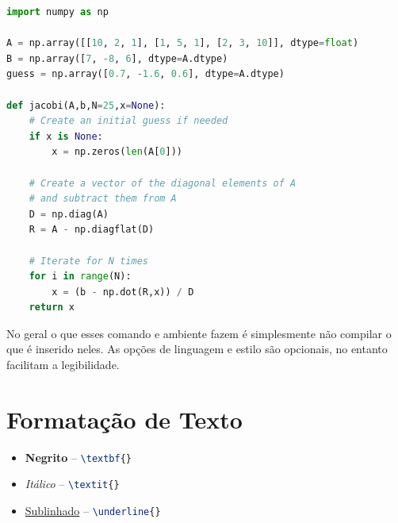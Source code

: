 \begin{lstlisting}[language=Python, style=Code]
import numpy as np

A = np.array([[10, 2, 1], [1, 5, 1], [2, 3, 10]], dtype=float)
B = np.array([7, -8, 6], dtype=A.dtype)
guess = np.array([0.7, -1.6, 0.6], dtype=A.dtype)

def jacobi(A,b,N=25,x=None):
    # Create an initial guess if needed                                                                                                                                                            
    if x is None:
        x = np.zeros(len(A[0]))

    # Create a vector of the diagonal elements of A                                                                                                                                                
    # and subtract them from A                                                                                                                                                                     
    D = np.diag(A)
    R = A - np.diagflat(D)

    # Iterate for N times                                                                                                                                                                          
    for i in range(N):
        x = (b - np.dot(R,x)) / D
    return x
\end{lstlisting}

    No geral o que esses comando e ambiente fazem é simplesmente não compilar o que é inserido neles.
    As opções de linguagem e estilo são opcionais, no entanto facilitam a legibilidade.


\section{Formatação de Texto}
\label{sec:formatacao}

    \begin{itemize}
        \item \textbf{Negrito} -- \lstinline[language=TeX,style=code]|\textbf{}|
        \item \textit{Itálico} -- \lstinline[language=TeX,style=code]|\textit{}|
        \item \underline{Sublinhado} -- \lstinline[language=TeX,style=code]|\underline{}|
    \end{itemize}

